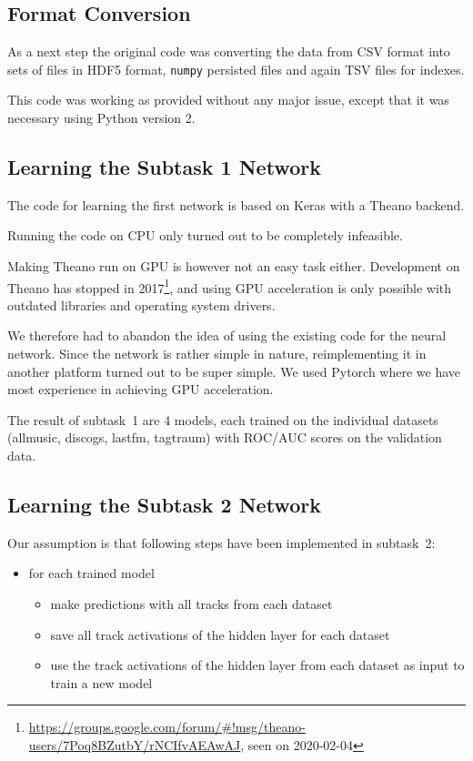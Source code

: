 \documentclass[sigconf,nonacm]{acmart}
\begin{document}
\subsection{Format Conversion}

As a next step the original code was converting the data from
CSV format into sets of files in HDF5 format, \texttt{numpy}
persisted files and again TSV files for indexes.

This code was working as provided without any major issue,
except that it was necessary using Python version 2.

\subsection{Learning the Subtask 1 Network}

The code for learning the first network is based on Keras
with a Theano backend.

Running the code on CPU only turned out to be completely infeasible.

Making Theano run on GPU is however not an easy task either.
Development on Theano has stopped in 
2017\footnote{\url{https://groups.google.com/forum/\#!msg/theano-users/7Poq8BZutbY/rNCIfvAEAwAJ}, seen on 2020-02-04},
and using GPU acceleration
is only possible with outdated libraries and operating system drivers.

We therefore had to abandon the idea of using the existing code
for the neural network.
Since the network is rather simple in nature, reimplementing
it in another platform turned out to be super simple.
We used Pytorch where we have most experience
in achieving GPU acceleration.

The result of subtask~1 are 4 models, each trained on the individual
datasets (allmusic, discogs, lastfm, tagtraum) with ROC/AUC scores
on the validation data.

\subsection{Learning the Subtask 2 Network}

Our assumption is that following steps have been implemented in subtask~2:

\begin{itemize}
  \item for each trained model
  \begin{itemize}
    \item make predictions with all tracks from each dataset
    \item save all track activations of the hidden layer for each dataset
    \item use the track activations of the hidden layer from each dataset as input to train a new model
  \end{itemize}
\end{itemize}
\end{document}

